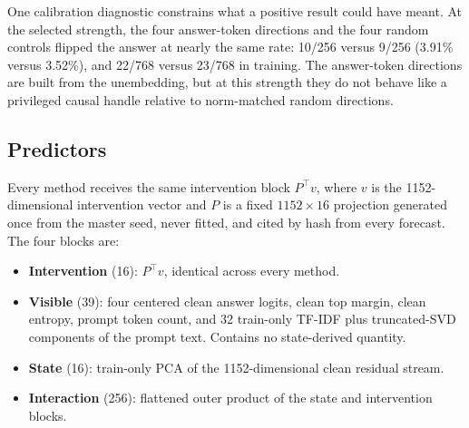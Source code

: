 \documentclass{article}
\begin{document}
One calibration diagnostic constrains what a positive result could have meant. At the selected
strength, the four answer-token directions and the four random controls flipped the answer at
nearly the same rate: 10/256 versus 9/256 (3.91\% versus 3.52\%), and 22/768 versus 23/768 in
training. The answer-token directions are built from the unembedding, but at this strength they do
not behave like a privileged causal handle relative to norm-matched random directions.

\subsection{Predictors}

Every method receives the same intervention block $P^{\top} v$, where $v$ is the 1152-dimensional
intervention vector and $P$ is a fixed $1152 \times 16$ projection generated once from the master
seed, never fitted, and cited by hash from every forecast. The four blocks are:

\begin{itemize}
  \item \textbf{Intervention} (16): $P^{\top} v$, identical across every method.
  \item \textbf{Visible} (39): four centered clean answer logits, clean top margin, clean entropy,
        prompt token count, and 32 train-only TF-IDF plus truncated-SVD components of the prompt
        text. Contains no state-derived quantity.
  \item \textbf{State} (16): train-only PCA of the 1152-dimensional clean residual stream.
  \item \textbf{Interaction} (256): flattened outer product of the state and intervention blocks.
\end{itemize}
\end{document}
